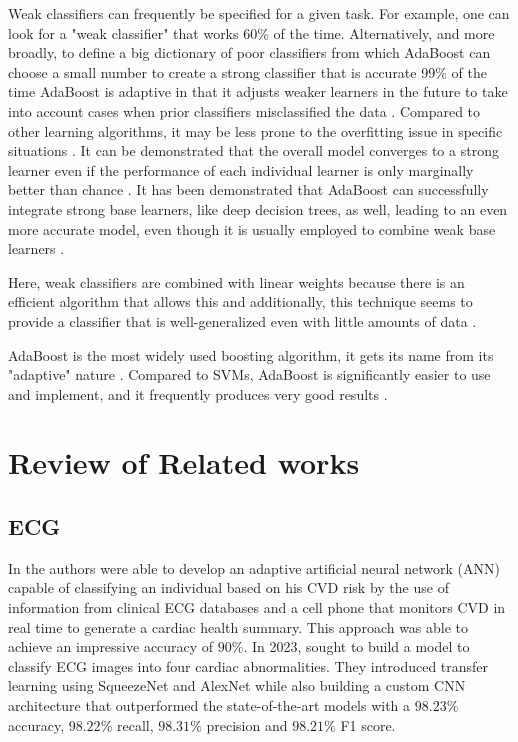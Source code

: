 \documentclass[12pt, a4paper,twoside]{report}
\numberwithin{equation}{chapter}
\begin{document}
Weak classifiers can frequently be specified for a given task. For example, one can look for a "weak classifier" that works 60\% of the time. Alternatively, and more broadly, to define a big dictionary of poor classifiers from which AdaBoost can choose a small number to create a strong classifier that is accurate 99\% of the time \parencite{sepulveda-oviedo-2023}
AdaBoost is adaptive in that it adjusts weaker learners in the future to take into account cases when prior classifiers misclassified the data \parencite{van-engelen-2019}. Compared to other learning algorithms, it may be less prone to the overfitting issue in specific situations \parencite{krawczyk-2016}. It can be demonstrated that the overall model converges to a strong learner even if the performance of each individual learner is only marginally better than chance \parencite{hullermeier-2021}. It has been demonstrated that AdaBoost can successfully integrate strong base learners, like deep decision trees, as well, leading to an even more accurate model, even though it is usually employed to combine weak base learners \parencite{mienye-2022}.
    
Here, weak classifiers are combined with linear weights because there is an efficient algorithm that allows this and additionally, this technique seems to provide a classifier that is well-generalized even with little amounts of data \parencite{schmidt-2019}. 

AdaBoost is the most widely used boosting algorithm, it gets its name from its "adaptive" nature \parencite{mehta-2019}. Compared to SVMs, AdaBoost is significantly easier to use and implement, and it frequently produces very good results \parencite{sagi-2018}.




\section{Review of Related works}
\subsection{ECG}

In \parencite{Jin_Sun_Cheng_2009} the authors were able to develop an adaptive artificial neural network (ANN) capable of classifying an individual based on his CVD risk by the use of information from clinical ECG databases and a cell phone that monitors CVD in real time to generate a cardiac health summary. This approach was able to achieve an impressive accuracy of $90\%$. In 2023, \parencite{9735300} sought to build a model to classify ECG images into four cardiac abnormalities. They introduced transfer learning using SqueezeNet and AlexNet while also building a custom CNN architecture that outperformed the state-of-the-art models with a $98.23\%$ accuracy, $98.22\%$ recall, $98.31\%$ precision and $98.21\%$ F1 score.
\end{document}
